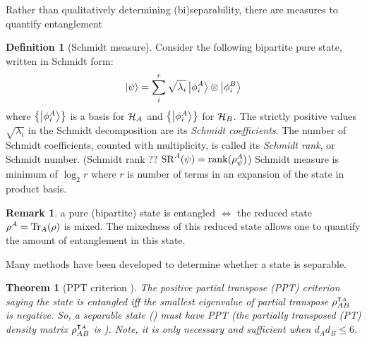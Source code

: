 \documentclass[
aps,
pra,
floatfix,
]{revtex4-2}
\theoremstyle{plain}
\newtheorem{theorem}{Theorem}
\theoremstyle{definition}
\newtheorem{definition}{Definition}
\newtheorem{remark}{Remark}
\newcommand{\ppt}{\textup{PPT}}
\newcommand{\dm}{\rho}
\begin{document}
Rather than qualitatively determining (bi)separability, there are measures to quantify entanglement
\begin{definition}[Schmidt measure]\label{def:schmidt_measure}
	Consider the following bipartite pure state, written in Schmidt form:
	\begin{equation}
		\ket{\psi} = \sum_i^r \sqrt{\lambda_i} \ket{\phi_i^A}\otimes\ket{\phi_i^B}
		\label{eq:schmidt_decomposition}
	\end{equation}
	where $\qty{\ket{\phi_i^A}}$ is a basis for $\mathcal{H}_A$ and $\qty{\ket{\phi_i^A}}$ for $\mathcal{H}_B$.
	The strictly positive values $\sqrt{\lambda_i}$ in the Schmidt decomposition are its \emph{Schmidt coefficients}. 
	The number of Schmidt coefficients, counted with multiplicity, is called its \emph{Schmidt rank}, or Schmidt number. (Schmidt rank ?? $\text{SR}^A(\psi)=\rank(\rho_{\psi}^A)$)
	Schmidt measure is minimum of $\log_2 r$ where $r$ is number of terms in an expansion of the state in product basis.
\end{definition}



\begin{remark}
	a pure (bipartite) state is entangled $\iff$ the reduced state $\dm^A=\Tr_A(\dm)$ is mixed.
	The mixedness of this reduced state allows one to quantify the amount of entanglement in this state.
\end{remark}

Many methods \cite{tothEntanglementDetectionStabilizer2005} have been developed to determine whether a state is separable.


\begin{theorem}[PPT criterion \cite{horodeckiSeparabilityMixedStates1996}]\label{thm:ppt}
	The positive partial transpose (\ppt) criterion saying the state is entangled iff the smallest eigenvalue of partial transpose $\dm_{AB}^{\T_A}$ is negative. 
	So, a separable state () must have PPT (the partially transposed (PT) density matrix $\dm_{AB}^{\T_A}$ is ).
	Note, it is only necessary and sufficient when $d_A d_B \le 6$.
\end{theorem}
\end{document}
